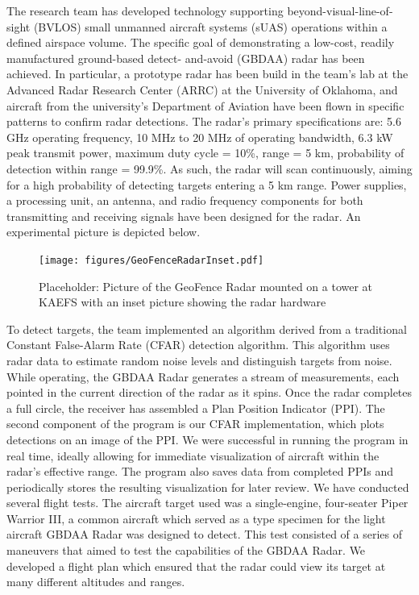 \documentclass[sensors,review,submit,moreauthors,pdftex,10pt,a4paper]{mdpi}
\theoremstyle{mdpi}
\newcounter{thm}
\newcounter{ex}
\newcounter{re}
\theoremstyle{mdpidefinition}
\begin{document}
The research team has developed technology supporting beyond-visual-line-of-sight (BVLOS) small unmanned aircraft systems (sUAS) operations within a defined airspace volume.  The specific goal of demonstrating a low-cost, readily manufactured ground-based detect- and-avoid (GBDAA) radar has been achieved.  In particular, a prototype radar has been build in the team's lab at the Advanced Radar Research Center (ARRC) at the University of Oklahoma, and aircraft from the university's Department of Aviation have been flown in specific patterns to confirm radar detections.  The radar's primary specifications are:  5.6 GHz operating frequency, 10 MHz to 20 MHz of operating bandwidth, 6.3 kW peak transmit power, maximum duty cycle = 10\%, range = 5 km, probability of detection within range = 99.9\%.  As such, the radar will scan continuously, aiming for a high probability of detecting targets entering a 5 km range. Power supplies, a processing unit, an antenna, and radio frequency components for both transmitting and receiving signals have been designed for the radar.  An experimental picture is depicted below.

\begin{figure}
\centering
\texttt{[image: figures/GeoFenceRadarInset.pdf]}
\caption{\label{fig:GeoFence} Placeholder: Picture of the GeoFence Radar mounted on a tower at KAEFS with an inset picture showing the radar hardware}
\end{figure}

To detect targets, the team implemented an algorithm derived from a traditional Constant False-Alarm Rate (CFAR) detection algorithm. This algorithm uses radar data to estimate random noise levels and distinguish targets from noise.  While operating, the GBDAA Radar generates a stream of measurements, each pointed in the current direction of the radar as it spins. Once the radar completes a full circle, the receiver has assembled a Plan Position Indicator (PPI). The second component of the program is our CFAR implementation, which plots detections on an image of the PPI. We were successful in running the program in real time, ideally allowing for immediate visualization of aircraft within the radar's effective range. The program also saves data from completed PPIs and periodically stores the resulting visualization for later review.  We have conducted several flight tests.  The aircraft target used was a single-engine, four-seater Piper Warrior III, a common aircraft which served as a type specimen for the light aircraft GBDAA Radar was designed to detect. This test consisted of a series of maneuvers that aimed to test the capabilities of the GBDAA Radar. We developed a flight plan which ensured that the radar could view its target at many different altitudes and ranges. 
\end{document}
